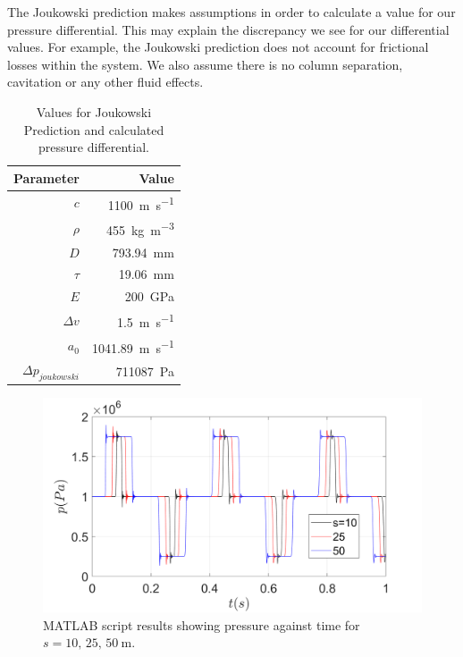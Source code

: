 The Joukowski prediction makes assumptions in order to calculate a value for our pressure differential. This may explain the discrepancy we see for our differential values. For example, the Joukowski prediction does not account for frictional losses within the system. We also assume there is no column separation, cavitation or any other fluid effects.

\begin{table}[H]
    \centering
    \begin{tabular}{@{}rr@{}}
        \toprule
        \textbf{Parameter}     & \textbf{Value}                       \\
        \midrule
        $c$                    & \SI{1100}{\meter\per\second}         \\
        $\rho$                 & \SI{455}{\kilo\gram\per\meter\cubed} \\
        $D$                    & \SI{793.94}{\milli\meter}            \\
        $\tau$                 & \SI{19.06}{\milli\meter}             \\
        $E$                    & \SI{200}{\giga\pascal}               \\
        $\Delta v$             & \SI{1.5}{\meter\per\second}          \\
        $a_0$                  & \SI{1041.89}{\meter\per\second}      \\
        $\Delta p_{joukowski}$ & \SI{711087}{\pascal}                 \\
        \bottomrule
    \end{tabular}
    \caption{Values for Joukowski Prediction and calculated pressure differential.}
    \label{matlabScriptVals}
\end{table}

\begin{figure}[H]
    \centering
    \includegraphics[width = 0.9 \textwidth]{img/fig1.png}
    \caption{MATLAB script results showing pressure against time for $s=10,\,25,\,\SI{50}{\meter}$.}
    \label{pressure1}
\end{figure}

